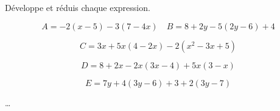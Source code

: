 \begin{exercice*}
    Développe et réduis chaque expression.

    \[A = -2(x - 5) - 3(7 - 4x) \quad B = 8 + 2y - 5(2y - 6) + 4\]  

    \[C = 3x + 5x(4 - 2x) - 2(x^2 - 3x + 5)\]

    \[D = 8 + 2x - 2x(3x - 4) + 5x(3 - x)\]

    \[E = 7y + 4(3y - 6) + 3 + 2(3y - 7)\]
\end{exercice*}
\begin{corrige}
    \dots
\end{corrige}

